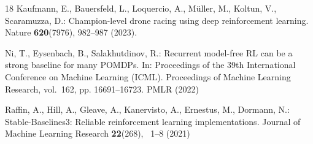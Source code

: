 \documentclass[runningheads]{llncs}
\begin{document}
\begin{thebibliography}{18}
Kaufmann, E., Bauersfeld, L., Loquercio, A., M{\"u}ller, M., Koltun, V.,
  Scaramuzza, D.: Champion-level drone racing using deep reinforcement
  learning. Nature  \textbf{620}(7976),  982--987 (2023).

Ni, T., Eysenbach, B., Salakhutdinov, R.: Recurrent model-free {RL} can be a
  strong baseline for many {POMDPs}. In: Proceedings of the 39th International
  Conference on Machine Learning (ICML). Proceedings of Machine Learning
  Research, vol.~162, pp. 16691--16723. PMLR (2022)

Raffin, A., Hill, A., Gleave, A., Kanervisto, A., Ernestus, M., Dormann, N.:
  {Stable-Baselines3}: Reliable reinforcement learning implementations. Journal
  of Machine Learning Research  \textbf{22}(268), ~1--8 (2021)

\end{thebibliography}
\end{document}
